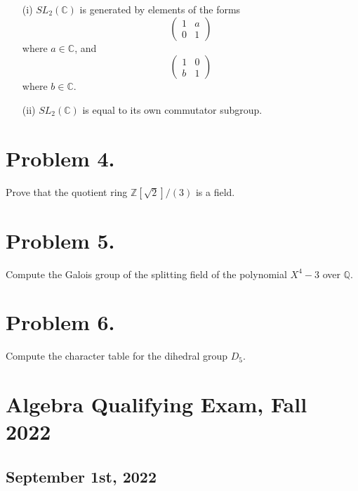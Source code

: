 \documentclass{article}
\begin{document}
\begin{enumerate}
    \item[(i)] \( SL_2(\mathbb{C}) \) is generated by elements of the forms
    \[
    \begin{pmatrix}
    1 & a \\
    0 & 1 
    \end{pmatrix}
    \]
    where \( a \in \mathbb{C} \), and
    \[
    \begin{pmatrix}
    1 & 0 \\
    b & 1 
    \end{pmatrix}
    \]
    where \( b \in \mathbb{C} \).
    
    \item[(ii)] \( SL_2(\mathbb{C}) \) is equal to its own commutator subgroup.
\end{enumerate}

\section*{Problem 4.}
Prove that the quotient ring \( \mathbb{Z}[\sqrt{2}]/(3) \) is a field.

\section*{Problem 5.}
Compute the Galois group of the splitting field of the polynomial \( X^4 - 3 \) over \( \mathbb{Q} \).

\section*{Problem 6.}
Compute the character table for the dihedral group \( D_5 \).


\section*{Algebra Qualifying Exam, Fall 2022}
\subsection*{September 1st, 2022}
\end{document}
